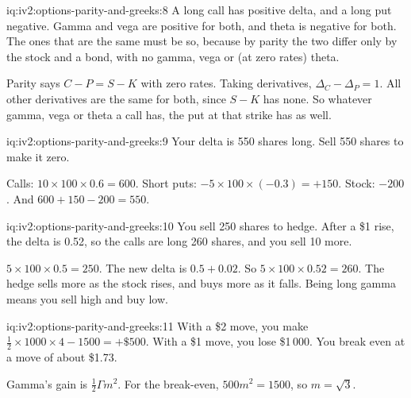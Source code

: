 \begin{solution}{iq:iv2:options-parity-and-greeks:8}
A long call has positive delta, and a long put negative. Gamma and vega are positive for both, and theta is negative for both. The ones that are the same must be so, because by parity the two differ only by the stock and a bond, with no gamma, vega or (at zero rates) theta.

Parity says $C - P = S - K$ with zero rates. Taking derivatives, $\Delta_C - \Delta_P = 1$. All other derivatives are the same for both, since $S - K$ has none. So whatever gamma, vega or theta a call has, the put at that strike has as well.

\end{solution}

\begin{solution}{iq:iv2:options-parity-and-greeks:9}
Your delta is 550 shares long. Sell 550 shares to make it zero.

Calls: $10 \times 100 \times 0.6 = 600$. Short puts: $-5 \times 100 \times (-0.3) = +150$. Stock: $-200$. And $600 + 150 - 200 = 550$.

\end{solution}

\begin{solution}{iq:iv2:options-parity-and-greeks:10}
You sell 250 shares to hedge. After a \$1 rise, the delta is 0.52, so the calls are long 260 shares, and you sell 10 more.

$5 \times 100 \times 0.5 = 250$. The new delta is $0.5 + 0.02$. So $5 \times 100 \times 0.52 = 260$. The hedge sells more as the stock rises, and buys more as it falls. Being long gamma means you sell high and buy low.

\end{solution}

\begin{solution}{iq:iv2:options-parity-and-greeks:11}
With a \$2 move, you make $\tfrac12 \times 1000 \times 4 - 1500 = +\$500$. With a \$1 move, you lose \$1\,000. You break even at a move of about \$1.73.

Gamma's gain is $\tfrac12\Gamma m^2$. For the break-even, $500m^2 = 1500$, so $m = \sqrt 3$.

\end{solution}

